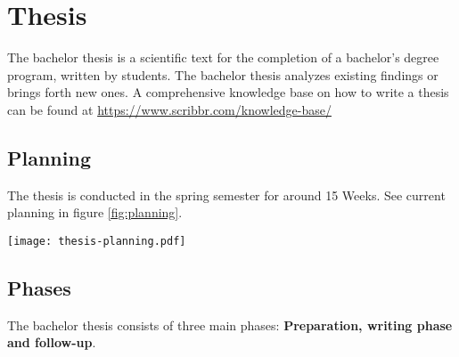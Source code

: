 \documentclass[a4paper,11pt,fleqn]{book}
\begin{document}
\frontmatter

\dominitoc



\setlength{\parskip}{1em}

\mainmatter

\setcounter{mtc}{1} %
\chapter{Thesis}

The bachelor thesis is a scientific text for the completion of a bachelor's degree program, written by students. The bachelor thesis analyzes existing findings or brings forth new ones. A comprehensive knowledge base on how to write a thesis can be found at \href{https://www.scribbr.com/knowledge-base/}{https://www.scribbr.com/knowledge-base/}

\minitoc\newpage

\section{Planning}
The thesis is conducted in the spring semester for around 15 Weeks. See current planning in figure \ref{fig:planning}.

\begin{center}
  \begingroup
  \texttt{[image: thesis-planning.pdf]}
  \label{fig:planning}
  \endgroup
\end{center}

\section{Phases}
The bachelor thesis consists of three main phases: \textbf{Preparation, writing phase and follow-up}.
\end{document}
